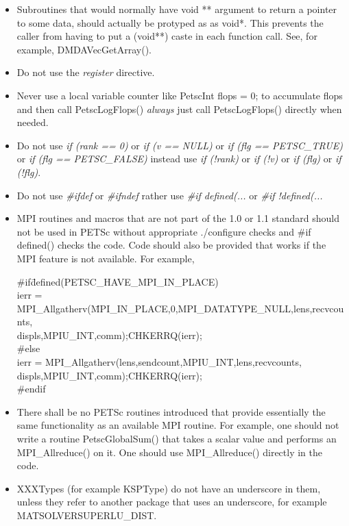 \documentclass[twoside,12pt]{../sty/report_petsc}
\begin{document}
\begin{itemize}
\item Subroutines that would normally have void ** argument to return a pointer to some data, should actually be protyped as as void*. This prevents the caller from having to put a (void**) caste in each function call. See, for example, DMDAVecGetArray().

\item Do not use the {\em register} directive.
\item Never use a local variable counter like PetscInt flops = 0; to accumulate flops and then call PetscLogFlops() {\em always} just
      call PetscLogFlops() directly when needed.
\item Do not use {\em if (rank == 0)} or {\em if (v == NULL)} or {\em if (flg == PETSC\_TRUE)} or {\em if (flg == PETSC\_FALSE)}
instead use {\em if (!rank)} or {\em if (!v)} or {\em if (flg)} or {\em if (!flg)}.
\item Do not use {\em \#ifdef} or {\em \#ifndef} rather use {\em \#if defined(...} or {\em \#if !defined(...}
\item MPI routines and macros that are not part of the 1.0 or 1.1 standard should not be used in PETSc without appropriate ./configure checks and \#if defined() checks the code. Code should also be provided that works if the MPI feature is not available. For example,
\begin{tabbing}
\#if\= defined(PETSC\_HAVE\_MPI\_IN\_PLACE)\\
\>    ierr  = MPI\_Allgatherv(\=MPI\_IN\_PLACE,0,MPI\_DATATYPE\_NULL,lens,recvcounts,\\
\> \> displs,MPIU\_INT,comm);CHKERRQ(ierr);\\
\#else\\
\>    ierr  = MPI\_Allgatherv(lens,sendcount,MPIU\_INT,lens,recvcounts,\\
\> \> displs,MPIU\_INT,comm);CHKERRQ(ierr);\\
\#endif
\end{tabbing}
\item There shall be no PETSc routines introduced that provide essentially the same functionality as an available MPI routine. For example, one should not write a routine PetscGlobalSum() that takes a scalar value and performs an MPI\_Allreduce() on it. One should use MPI\_Allreduce() directly in the code.
\item XXXTypes (for example KSPType) do not have an underscore in them, unless they refer to another package that uses an underscore, for example MATSOLVERSUPERLU\_DIST.
\end{itemize}
\end{document}

